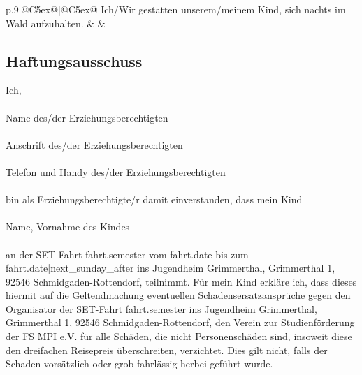 {{{{{{\begin{Form}
\begin{longtable}{p{.9\linewidth}|@{}C{5ex}@{}|@{}C{5ex}@{}}
    Ich/Wir gestatten unserem/meinem Kind, sich nachts im Wald aufzuhalten. & \CheckBox[borderwidth=0.1mm,name=cp4,width=5ex,height=1.5ex]{} & \CheckBox[borderwidth=0.1mm,name=cn4,width=5ex,height=1.5ex]{} \\ \hline
    \end{longtable}
    {%

    \subsection*{Haftungsausschuss}
    Ich,\\
    \\
    \TextField[charsize={12pt},multiline=true,height={1cm},width={\linewidth},name={guardian2},bordercolor={0.2 0.2 0.7}]{}\newline
    Name des/der Erziehungsberechtigten\\
    \\
    \TextField[charsize={12pt},multiline=true,height={1cm},width={\linewidth},name={guardian_adress},bordercolor={0.2 0.2 0.7}]{}\newline
    Anschrift des/der Erziehungsberechtigten\\
    \\
    \TextField[charsize={12pt},multiline=true,height={2.5cm},width={\linewidth},name={guardian_contact2},bordercolor={0.2 0.2 0.7}]{}\newline
    Telefon und Handy des/der Erziehungsberechtigten\\
    \\
    bin als Erziehungsberechtigte/r damit einverstanden, dass mein Kind\\
    \\
    \TextField[charsize={12pt},multiline=true,height={1cm},width={\linewidth},name={name2},bordercolor={0.2 0.2 0.7},default={ {{ participant.surname|latex_escape }}, {{ participant.firstname|latex_escape }}}]{}\newline
    Name, Vornahme des Kindes\\
    \\
    an der SET-Fahrt {{ fahrt.semester }} vom {{ fahrt.date }} bis zum {{ fahrt.date|next_sunday_after }} ins Jugendheim Grimmerthal, Grimmerthal 1, 92546 Schmidgaden-Rottendorf, teilnimmt. Für mein Kind erkläre ich, dass
    dieses hiermit auf die Geltendmachung eventuellen Schadensersatzansprüche gegen den Organisator
    der SET-Fahrt {{ fahrt.semester }} ins Jugendheim Grimmerthal, Grimmerthal 1, 92546 Schmidgaden-Rottendorf,
    den Verein zur Studienförderung der FS MPI e.V. für alle Schäden, die nicht Personenschäden sind,
    insoweit diese den dreifachen Reisepreis überschreiten, verzichtet. Dies gilt nicht, falls der Schaden
    vorsätzlich oder grob fahrlässig herbei geführt wurde.\\
    \\
    {%

}}
\end{Form}}}}}}}
